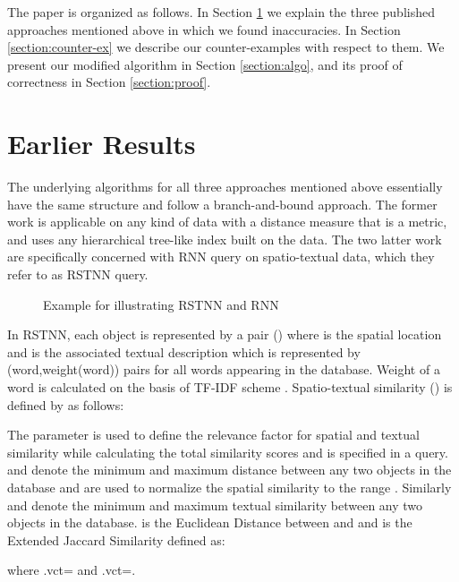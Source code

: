 \documentclass[prodmode,letterpaper]{acmsmall}
\newcommand{\rknn}{RNN\xspace}
\newcommand{\rstknn}{RSTNN\xspace}
\begin{document}
The paper is organized as follows. In Section \ref{section:earlier} we explain
the three published approaches mentioned above in which we found
inaccuracies. In Section \ref{section:counter-ex} we describe our counter-examples with respect to them.
We present our modified algorithm in Section \ref{section:algo}, and its
proof of correctness in Section \ref{section:proof}.

\section{Earlier Results}\label{section:earlier}
The underlying algorithms for all three approaches mentioned above essentially
have the same structure and follow a branch-and-bound approach. The former work
is applicable on any kind of data with a distance measure that is a metric, and
uses any hierarchical tree-like index built on the data. The two latter work are
specifically concerned with \rknn query on spatio-textual data, which they
refer to as \rstknn query.

\begin{figure}[!tbh]
\begin{center}
\caption{\small Example for illustrating \rstknn and \rknn}
\label{fig:example}
\end{center}
\end{figure}

In \rstknn, each object is
represented by a pair () where  is the spatial location and  is the
associated textual description which is represented by (word,weight(word)) pairs
for all words appearing in the database. Weight of a word
is calculated on the basis of TF-IDF scheme \cite{salton1988term}. Spatio-textual similarity () is defined by \cite{lu2011reverse} as follows:
 
The parameter  is used to define the relevance factor for spatial and
textual similarity while calculating the total similarity scores and is
specified in a query.  and  denote the minimum and maximum
distance between any two objects in the database and are used to normalize the
spatial similarity to the range . Similarly  and  denote
the minimum and maximum textual similarity between any two objects in the
database.  is the Euclidean Distance between  and  and
 is the
Extended Jaccard Similarity \cite{tan2011v} defined as:

where .vct= and .vct=.
\end{document}
